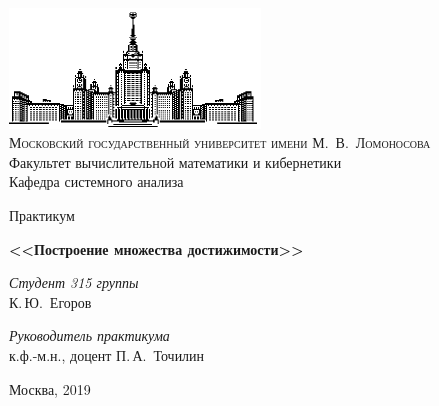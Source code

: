 \thispagestyle{empty}
\begin{center}
    \ \vspace{-3cm}

    \includegraphics[width=0.5\textwidth]{title_page/msu.eps}\\

    {\scshape Московский государственный университет имени М.~В.~Ломоносова}\\
    Факультет вычислительной математики и кибернетики\\
    Кафедра системного анализа

    \vfill

    {\LARGE Практикум}

    \vspace{1cm}

    {\Huge\bfseries <<Построение множества достижимости>>}
\end{center}

\vspace{3cm}

\begin{flushright}
    \large
    \textit{Студент 315 группы}\\
    К.\,Ю.~Егоров

    \vspace{5mm}

    \textit{Руководитель практикума}\\
    к.ф.-м.н., доцент П.\,А.~Точилин
\end{flushright}

\vfill

\begin{center}
    Москва, 2019
\end{center}

\clearpage